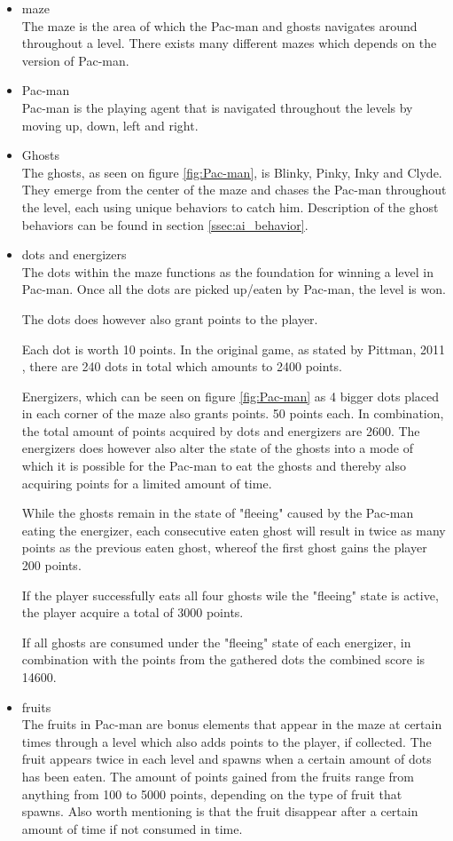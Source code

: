 \begin{itemize}
\item maze\\
The maze is the area of which the Pac-man and ghosts navigates around throughout a level. There exists many different mazes which depends on the version of Pac-man.
\item Pac-man\\
Pac-man is the playing agent that is navigated throughout the levels by moving up, down, left and right.
\item Ghosts\\
The ghosts, as seen on figure \ref{fig:Pac-man}, is Blinky, Pinky, Inky and Clyde. They emerge from the center of the maze and chases the Pac-man throughout the level, each using unique behaviors to catch him. Description of the ghost behaviors can be found in section \ref{ssec:ai_behavior}.
\item dots and energizers\\
The dots within the maze functions as the foundation for winning a level in Pac-man. Once all the dots are picked up/eaten by Pac-man, the level is won.

The dots does however also grant points to the player.

Each dot is worth 10 points. In the original game, as stated by Pittman, 2011 \cite{Pittman2011}, there are 240 dots in total which amounts to 2400 points.

Energizers, which can be seen on figure \ref{fig:Pac-man} as 4 bigger dots placed in each corner of the maze also grants points. 50 points each.
In combination, the total amount of points acquired by dots and energizers are  2600. The energizers does however also alter the state of the ghosts into a mode of which it is possible for the Pac-man to eat the ghosts and thereby also acquiring points for a limited amount of time.

While the ghosts remain in the state of "fleeing" caused by the Pac-man eating the energizer, each consecutive eaten ghost will result in twice as many points as the previous eaten ghost, whereof the first ghost gains the player 200 points.

If the player successfully eats all four ghosts wile the "fleeing" state is active, the player acquire a total of 3000 points.

If all ghosts are consumed under the "fleeing" state of each energizer, in combination with the points from the gathered dots the combined score is 14600.
\item fruits\\
The fruits in Pac-man are bonus elements that appear in the maze at certain times through a level which also adds points to the player, if collected. The fruit appears twice in each level and spawns when a certain amount of dots has been eaten.
The amount of points gained from the fruits range from anything from 100 to 5000 points, depending on the type of fruit that spawns. Also worth mentioning is that the fruit disappear after a certain amount of time if not consumed in time.
\end{itemize}

